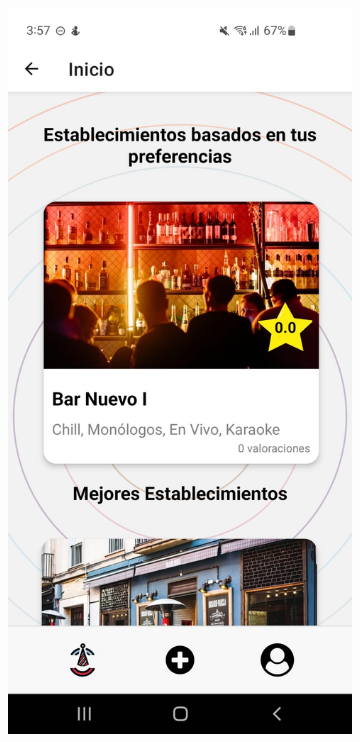 \clearpage
\vspace*{\fill}
\begin{figure}[H]
    \centering
    \begin{subfigure}{0.45\textwidth}
        \centering
        \includegraphics[width=\linewidth]{imagenes/Capturas/InicioUsuario.jpeg}

\end{subfigure}
\end{figure}
